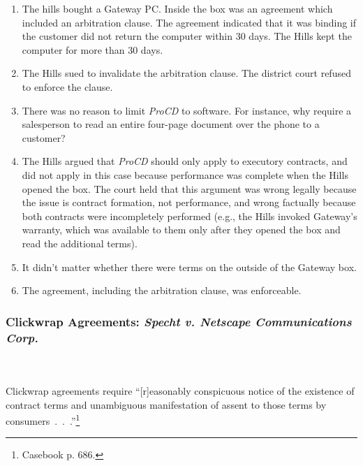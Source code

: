 \begin{enumerate}
    \item The hills bought a Gateway PC. Inside the box was an agreement which 
    included an arbitration clause. The agreement indicated that it was 
    binding if the customer did not return the computer within 30 days. The 
    Hills kept the computer for more than 30 days.
    \item The Hills sued to invalidate the arbitration clause. The district 
    court refused to enforce the clause.
    \item There was no reason to limit \emph{ProCD} to software. For instance, 
    why require a salesperson to read an entire four-page document over the 
    phone to a customer?
    \item The Hills argued that \emph{ProCD} should only apply to executory 
    contracts, and did not apply in this case because performance was complete 
    when the Hills opened the box. The court held that this argument was wrong 
    legally because the issue is contract formation, not performance, and 
    wrong factually because both contracts were incompletely performed (e.g., 
    the Hills invoked Gateway's warranty, which was available to them only 
    after they opened the box and read the additional terms).
    \item It didn't matter whether there were terms on the outside of the 
    Gateway box.
    \item The agreement, including the arbitration clause, was enforceable.
\end{enumerate}

\subsubsection{Clickwrap Agreements: \emph{Specht v. Netscape Communications 
Corp.}}
~\\\\
Clickwrap agreements require ``[r]easonably conspicuous notice of the 
existence of contract terms and unambiguous manifestation of assent to those 
terms by consumers~.~.~.''\footnote{Casebook p. 686.}

